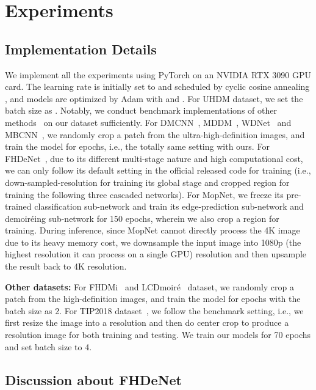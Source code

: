 \documentclass[runningheads]{llncs}
\newcommand{\ie}{i.e.}
\begin{document}
\section{Experiments}\label{sec:result}
\subsection{Implementation Details}
We implement all the experiments using PyTorch on an NVIDIA RTX 3090 GPU card. The learning rate is initially set to  and scheduled by cyclic cosine annealing \cite{loshchilov2016sgdr}, and models are optimized by Adam \cite{kingma2014adam} with  and . For UHDM dataset, we set the batch size as . Notably, we conduct benchmark implementations of other methods~\cite{sun2018moire,zheng2020image,he2019mop,he2020fhde,cheng2019multi,liu2020wavelet} on our dataset sufficiently. For DMCNN~\cite{sun2018moire}, MDDM~\cite{cheng2019multi}, WDNet~\cite{liu2020wavelet} and MBCNN~\cite{zheng2020image}, we randomly crop a  patch from the ultra-high-definition images, and train the model for  epochs, i.e., the totally same setting with ours. For FHDeNet~\cite{he2020fhde}, due to its different multi-stage nature and high computational cost, we can only follow its default setting in the official released code for training (\ie, 
down-sampled-resolution  for training its global stage and cropped  region for training the following three cascaded networks). For MopNet\cite{he2019mop}, we freeze its pre-trained classification sub-network and train its edge-prediction sub-network and demoiréing sub-network for 150 epochs, wherein we also crop a  region for training. During inference, since MopNet cannot directly process the 4K image due to its heavy memory cost, we downsample the input image into 1080p (the highest resolution it can process on a single GPU) resolution and then upsample the result back to 4K resolution.   

\noindent\textbf{Other datasets:}
For FHDMi~\cite{he2020fhde} and LCDmoiré~\cite{yuan2019aim} dataset, we randomly crop a  patch from the high-definition images, and train the model for  epochs with the batch size as 2. For TIP2018 dataset~\cite{sun2018moire}, we follow the benchmark setting, \ie, we first resize the image into a  resolution and then do center crop to produce a  resolution image for both training and testing. We train our models for 70 epochs and set batch size to 4. 

\subsection{Discussion about FHDeNet}
\label{sec:fhd}
\end{document}
